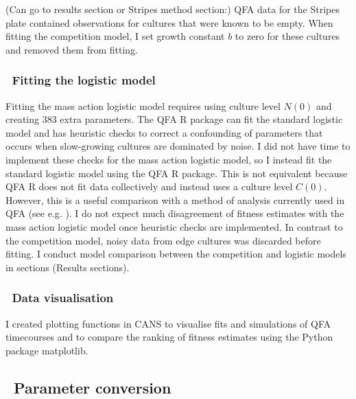 (Can go to results section or Stripes method section:) QFA data for
the Stripes plate contained observations for cultures that were known
to be empty. When fitting the competition model, I set growth constant
\(b\) to zero for these cultures and removed them from fitting.

\subsubsection{\thesubsubsection~Fitting the logistic model}

Fitting the mass action logistic model requires using culture level
\(N(0)\) and creating 383 extra parameters. The QFA R package
\citep{qfa2016} can fit the standard logistic model and has heuristic
checks to correct a confounding of parameters that occurs when
slow-growing cultures are dominated by noise. I did not have time to
implement these checks for the mass action logistic model, so I
instead fit the standard logistic model using the QFA R package. This
is not equivalent because QFA R does not fit data collectively and
instead uses a culture level \(C(0)\). However, this is a useful
comparison with a method of analysis currently used in QFA (see
e.g. \citet{Addinall2011}). I do not expect much disagreement of
fitness estimates with the mass action logistic model once heuristic
checks are implemented. In contrast to the competition model, noisy
data from edge cultures was discarded before fitting. I conduct model
comparison between the competition and logistic models in sections
(Results sections).

\subsubsection{\thesubsubsection~Data visualisation}

I created plotting functions in CANS to visualise fits and simulations
of QFA timecourses and to compare the ranking of fitness estimates
using the Python package matplotlib.

\subsection{\thesubsection~Parameter conversion}
\label{sec:parameter_conversion}

